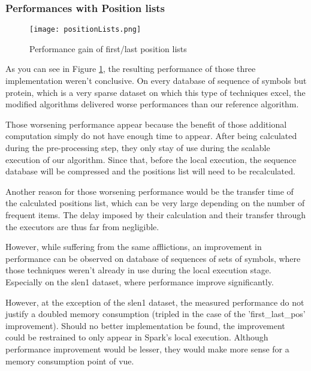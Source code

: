 \documentclass{eplmastersthesis}
\begin{document}
\subsubsection{Performances with Position lists}

\begin{figure}[h]
  \centering
  \texttt{[image: positionLists.png]}
  \caption{Performance gain of first/last position lists}
  \label{fig:positionListPerf}
\end{figure}

As you can see in Figure \ref{fig:positionListPerf}, the resulting performance of those three implementation weren't conclusive. On every database of sequence of symbols but protein, which is a very sparse dataset on which this type of techniques excel, the modified algorithms delivered worse performances than our reference algorithm. \newline

Those worsening performance appear because the benefit of those additional computation simply do not have enough time to appear. After being calculated during the pre-processing step, they only stay of use during the scalable execution of our algorithm. Since that, before the local execution, the sequence database will be compressed and the positions list will need to be recalculated. \newline

Another reason for those worsening performance would be the transfer time of the calculated positions list, which can be very large depending on the number of frequent items. The delay imposed by their calculation and their transfer through the executors are thus far from negligible. \newline

However, while suffering from the same afflictions, an improvement in performance can be observed on database of sequences of sets of symbols, where those techniques weren't already in use during the local execution stage. Especially on the slen1 dataset, where performance improve significantly. \newline

However, at the exception of the slen1 dataset, the measured performance do not justify a doubled memory consumption (tripled in the case of the 'first\_last\_pos' improvement). Should no better implementation be found, the improvement could be restrained to only appear in Spark's local execution. Although performance improvement would be lesser, they would make more sense for a memory consumption point of vue.
\end{document}
